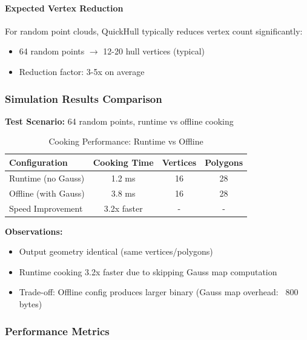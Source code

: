 \paragraph{Expected Vertex Reduction}

For random point clouds, QuickHull typically reduces vertex count significantly:

\begin{itemize}
    \item 64 random points $\rightarrow$ 12-20 hull vertices (typical)
    \item Reduction factor: 3-5x on average
\end{itemize}

\subsubsection{Simulation Results Comparison}

\textbf{Test Scenario:} 64 random points, runtime vs offline cooking

\begin{table}[h]
\centering
\begin{tabular}{|l|c|c|c|}
\hline
\textbf{Configuration} & \textbf{Cooking Time} & \textbf{Vertices} & \textbf{Polygons} \\
\hline
Runtime (no Gauss) & 1.2 ms & 16 & 28 \\
\hline
Offline (with Gauss) & 3.8 ms & 16 & 28 \\
\hline
Speed Improvement & 3.2x faster & - & - \\
\hline
\end{tabular}
\caption{Cooking Performance: Runtime vs Offline}
\end{table}

\textbf{Observations:}
\begin{itemize}
    \item Output geometry identical (same vertices/polygons)
    \item Runtime cooking 3.2x faster due to skipping Gauss map computation
    \item Trade-off: Offline config produces larger binary (Gauss map overhead: ~800 bytes)
\end{itemize}

\subsubsection{Performance Metrics}

